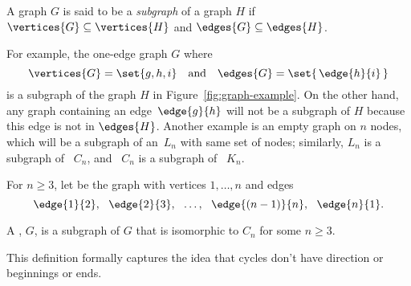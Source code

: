 \begin{definition}\label{def:subgraph}
  A graph $G$ is said to be a \emph{subgraph} of a graph $H$ if
  $\vertices{G} \subseteq \vertices{H}$ and $\edges{G} \subseteq
  \edges{H}$.
\end{definition}

For example, the one-edge graph $G$ where
\begin{equation*}
   \vertices{G} = \set{ g, h, i } \quad \text{and}\quad  \edges{G} =
   \set{\, \edge{h}{i} \, }
\end{equation*}
is a subgraph of the graph $H$ in Figure~\ref{fig:graph-example}.  On the
other hand, any graph containing an edge~$\edge{g}{h}$ will not be a
subgraph of $H$ because this edge is not in $\edges{H}$.  Another example
is an empty graph on $n$ nodes, which will be a subgraph of an~$L_n$ with
same set of nodes; similarly, $L_n$ is a subgraph of ~$C_n$, and ~$C_n$ is
a subgraph of ~$K_n$.

\begin{definition}
  For $n \ge 3$, let  be the graph with vertices $1,\dots, n$
  and edges
\[
\edge{1}{2},\ \ \edge{2}{3},\ \ \dots,\ \ \edge{(n-1)}{n},\ \ \edge{n}{1}.
\]

\iffalse
A graph is a \term{cycle} of length $n$ iff it is isomorphic to $C_n$
for some $n \ge 3$.
\fi

A , $G$, is a subgraph of $G$ that is
isomorphic to $C_n$ for some $n \ge 3$.
\end{definition}

This definition formally captures the idea that cycles don't
have direction or beginnings or ends.

\iffalse


